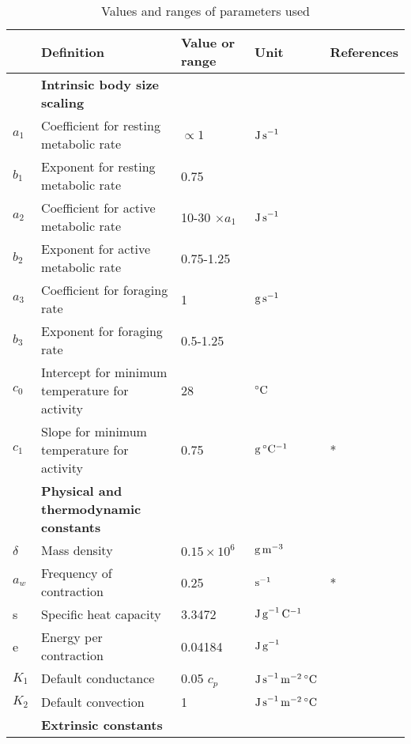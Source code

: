 
\begin{table}
  \begin{threeparttable}[b]
\caption{Values and ranges of parameters used }
\begin{tabular}{l l l l l}
\hline
 & Definition & Value or range & Unit & References \\
\hline
&\textbf{Intrinsic body size scaling} & & &  \\
$a_1$ & Coefficient for resting metabolic rate  & $\propto 1$  & $\rm{J \, s}^{-1}$ & \tnote{1} \\
$b_1$ & Exponent for resting metabolic rate  & 0.75 &  & \tnote{2} \\
$a_2$ & Coefficient for active metabolic rate  & 10-30 $ \times a_1$ & $\rm{J \, s}^{-1}$ &  \tnote{3} \\
$b_2$ & Exponent for active metabolic rate  & 0.75-1.25 & &  \tnote{1} \\
$a_3$ & Coefficient for foraging rate  & 1 & $\rm{g \, s}^{-1}$  & \\
$b_3$ & Exponent  for foraging rate  & 0.5-1.25 &  &  \tnote{4}  \\
$c_0$ & Intercept for minimum temperature for activity & 28 & $^{\circ}\rm{C}$  & \tnote{5}\\
$c_1$ & Slope for minimum temperature for activity & 0.75 &  $\rm{g \,  ^{\circ}C^{-1}}$ &  \tnote{5} \hspace{0.1cm}* \\
& \textbf{Physical and thermodynamic constants} & & &  \\
$\delta $ & Mass density & $0.15 \times 10^6$  & $\rm{g \, m}^{-3}$  & \tnote{6}\\
$a_w$& Frequency of contraction & 0.25 & $\rm{s}^{-1}$   & \tnote{7} \hspace{0.1cm}*\\
s & Specific heat capacity & 3.3472 & $\rm{J \, g}^{-1}\,\rm{C}^{-1}$ & \tnote{1} \\
e & Energy per contraction & 0.04184 & $\rm{J \, g}^{-1}$ & \tnote{8} \\
$K_1$& Default conductance & 0.05 $c_p$ & $\rm{J \,s}^{-1} \, \rm{m}^{-2} \, ^{\circ}\rm{C}$  & \tnote{9} \\
$K_2$& Default convection & 1   & $\rm{J \,s}^{-1} \, \rm{m}^{-2} \, ^{\circ}\rm{C}$  & \tnote{9} \\
& \textbf{Extrinsic constants} & & &  \\

\end{tabular}
\end{threeparttable}
\end{table}
